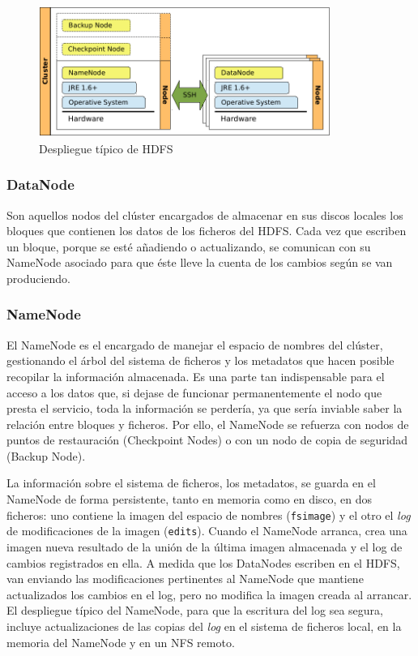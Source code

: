 \begin{figure}[tbp]
\begin{center}
\includegraphics[width=0.85\textwidth]{imagenes/017.pdf}
 \caption{Despliegue t\'ipico de HDFS}
\label{fig:desplieguehdfs}
\end{center}
\end{figure}


\subsubsection{DataNode}\label{subsubsec:datanode}
\noindent Son aquellos nodos del cl\'uster encargados de almacenar en sus discos locales los bloques que contienen los datos de los ficheros del HDFS. Cada vez que escriben un bloque, porque se est\'e a\~nadiendo o actualizando, se comunican con su NameNode asociado para que \'este lleve la cuenta de los cambios seg\'un se van produciendo.


\subsubsection{NameNode}\label{subsubsec:namenode}
\noindent El NameNode es el encargado de manejar el espacio de nombres del cl\'uster, gestionando el \'arbol del sistema de ficheros y los metadatos que hacen posible recopilar la informaci\'on almacenada. Es una parte tan indispensable para el acceso a los datos que, si dejase de funcionar permanentemente el nodo que presta el servicio, toda la informaci\'on se perder\'ia, ya que ser\'ia inviable saber la relaci\'on entre bloques y ficheros. Por ello, el NameNode se refuerza con nodos de puntos de restauraci\'on (Checkpoint Nodes) o con un nodo de copia de seguridad (Backup Node).\newline

La informaci\'on sobre el sistema de ficheros, los metadatos, se guarda en el NameNode de forma persistente, tanto en memoria como en disco, en dos ficheros: uno contiene la imagen del espacio de nombres (\texttt{fsimage}) y el otro el \emph{log} de modificaciones de la imagen (\texttt{edits}). Cuando el NameNode arranca, crea una imagen nueva resultado de la uni\'on de la \'ultima imagen almacenada y el log de cambios registrados en ella. A medida que los DataNodes escriben en el HDFS, van enviando las modificaciones pertinentes al NameNode que mantiene actualizados los cambios en el log, pero no modifica la imagen creada al arrancar. El despliegue t\'ipico del NameNode, para que la escritura del log sea segura, incluye actualizaciones de las copias del \emph{log} en el sistema de ficheros local, en la memoria del NameNode y en un NFS remoto.


